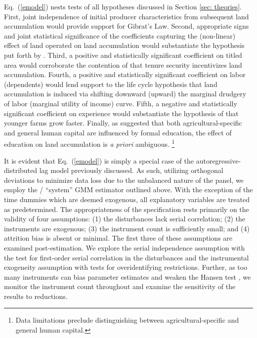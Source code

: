 \documentclass[english]{article}
\begin{document}
Eq.\ (\ref{emodel}) nests tests of all hypotheses discussed in Section 
\ref{sec: theories}. 
First, joint independence of initial producer characteristics from 
subsequent land accumulation would provide support for Gibrat's Law.
Second, appropriate signs and joint statistical significance of the coefficients 
capturing the (non-linear) effect of land operated on land accumulation 
would substantiate the hypothesis put forth by \citet{carter1993}.
Third, a positive and statistically significant coefficient on titled area would 
corroborate the contention of \citet{carter1998b} that tenure security 
incentivizes land accumulation.
Fourth, a positive and statistically significant coefficient on labor 
(dependents) would lend support to the life cycle hypothesis that land 
accumulation is induced via shifting downward (upward) the marginal 
drudgery of labor (marginal utility of income) curve.
Fifth, a negative and statistically significant coefficient on experience 
would substantiate the hypothesis of \citet{jovanovic1982} that younger 
farms grow faster. 
Finally, as \citet{rodgers1994} suggested that both agricultural-specific and
general human capital are influenced by formal education, the effect of 
education on land accumulation is \emph{a priori} ambiguous.%
\footnote{Data limitations preclude distinguishing between 
agricultural-specific and general human capital.}

It is evident that Eq.\ (\ref{emodel}) is simply a special case of the 
autoregressive-distributed lag model previously discussed. 
As such, utilizing orthogonal deviations to minimize data loss due to the 
unbalanced nature of the panel, we employ the 
\citet{arellano1995}/\citet{blundell1998} ``system'' GMM estimator 
outlined above. 
With the exception of the time dummies which are deemed exogenous, all 
explanatory variables are treated as predetermined. 
The appropriateness of the specification rests primarily on the validity of 
four assumptions: (1) the disturbances lack serial correlation; (2) the 
instruments are exogenous; (3) the instrument count is sufficiently small; 
and (4) attrition bias is absent or minimal. 
The first three of these assumptions are examined post-estimation.
We explore the serial independence assumption with the \citet{arellano1991} 
test for first-order serial correlation in the disturbances and the instrumental 
exogeneity assumption with \citet{hansen1982} tests for overidentifying 
restrictions. 
Further, as too many instruments can bias parameter estimates and weaken 
the Hansen test \citep{roodman2009b}, we monitor the instrument count 
throughout and examine the sensitivity of the results to reductions.
\end{document}
